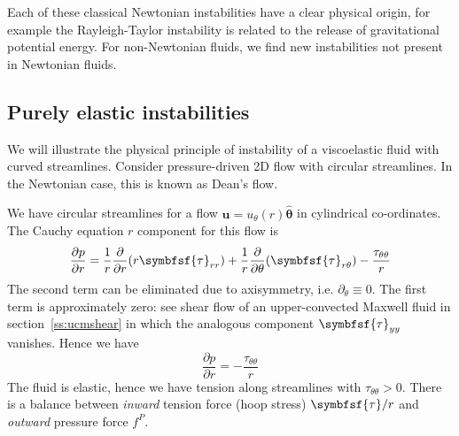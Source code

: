 \documentclass{jknotes}
\begin{document}
Each of these classical Newtonian instabilities have a clear physical origin,
for example the Rayleigh-Taylor instability is related to the release of
gravitational potential energy. For non-Newtonian fluids, we find new
instabilities not present in Newtonian fluids.

\subsection{Purely elastic instabilities}
We will illustrate the physical principle of instability of a viscoelastic
fluid with curved streamlines. Consider pressure-driven 2D flow with circular
streamlines. In the Newtonian case, this is known as Dean's flow. 

\begin{wrapfigure}{l}{0.25\textwidth}
\end{wrapfigure}

We have circular streamlines for a flow $\symbf{u} =
u_{\theta}(r)\hat{\symbf{\theta}}$ in cylindrical co-ordinates. The Cauchy
equation $r$ component for this flow is
\begin{equation}
	\frac{\partial p}{\partial r} = \frac{1}{r}\frac{\partial}{\partial
		r}(r\symbfsf{\tau}_{rr}) + \frac{1}{r} \frac{\partial}{\partial
	\theta} (\symbfsf{\tau}_{r\theta}) - \frac{\tau_{\theta\theta}}{r}
\end{equation}
The second term can be eliminated due to axisymmetry, i.e. $\partial_\theta
\equiv 0$. The first term is approximately zero: see shear flow of an
upper-convected Maxwell fluid in section~\ref{ss:ucmshear} in which the
analogous component $\symbfsf{\tau}_{yy}$ vanishes. Hence we have
\begin{equation}
	\frac{\partial p}{\partial r} = -\frac{\tau_{\theta\theta}}{r}
\end{equation}
The fluid is elastic, hence we have tension along streamlines with
$\tau_{\theta\theta} > 0$. There is a balance between \emph{inward} tension
force (hoop stress) $\symbfsf{\tau}/r$ and \emph{outward} pressure force
$f^P$.
\end{document}
